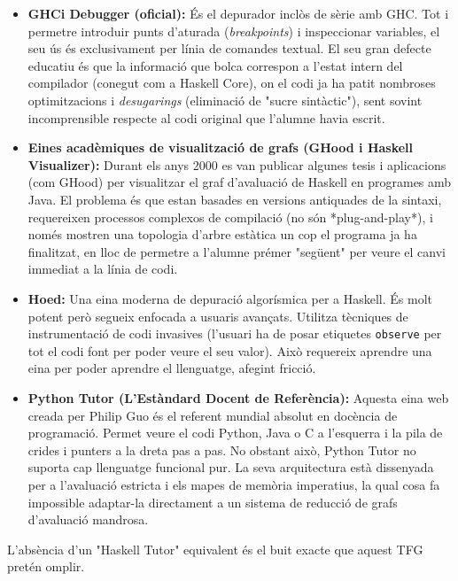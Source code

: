 \begin{itemize}
    \item \textbf{GHCi Debugger (oficial):} És el depurador inclòs de sèrie amb GHC. Tot i permetre introduir punts d'aturada (\textit{breakpoints}) i inspeccionar variables, el seu ús és exclusivament per línia de comandes textual. El seu gran defecte educatiu és que la informació que bolca correspon a l'estat intern del compilador (conegut com a Haskell Core), on el codi ja ha patit nombroses optimitzacions i \textit{desugarings} (eliminació de "sucre sintàctic"), sent sovint incomprensible respecte al codi original que l'alumne havia escrit.
    
    \item \textbf{Eines acadèmiques de visualització de grafs (GHood i Haskell Visualizer):} Durant els anys 2000 es van publicar algunes tesis i aplicacions (com GHood) per visualitzar el graf d'avaluació de Haskell en programes amb Java. El problema és que estan basades en versions antiquades de la sintaxi, requereixen processos complexos de compilació (no són *plug-and-play*), i només mostren una topologia d'arbre estàtica un cop el programa ja ha finalitzat, en lloc de permetre a l'alumne prémer "següent" per veure el canvi immediat a la línia de codi.
    
    \item \textbf{Hoed:} Una eina moderna de depuració algorísmica per a Haskell. És molt potent però segueix enfocada a usuaris avançats. Utilitza tècniques de instrumentació de codi invasives (l'usuari ha de posar etiquetes \texttt{observe} per tot el codi font per poder veure el seu valor). Això requereix aprendre una eina per poder aprendre el llenguatge, afegint fricció.
    
    \item \textbf{Python Tutor (L'Estàndard Docent de Referència):} Aquesta eina web creada per Philip Guo és el referent mundial absolut en docència de programació. Permet veure el codi Python, Java o C a l'esquerra i la pila de crides i punters a la dreta pas a pas. No obstant això, Python Tutor no suporta cap llenguatge funcional pur. La seva arquitectura està dissenyada per a l'avaluació estricta i els mapes de memòria imperatius, la qual cosa fa impossible adaptar-la directament a un sistema de reducció de grafs d'avaluació mandrosa. 
\end{itemize}

L'absència d'un "Haskell Tutor" equivalent és el buit exacte que aquest TFG pretén omplir.

